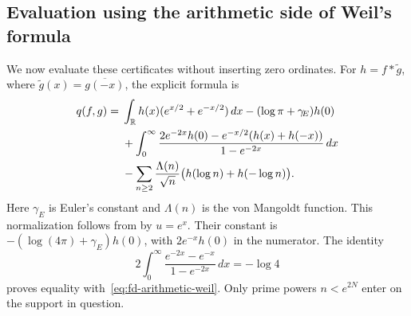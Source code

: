 \subsection{Evaluation using the arithmetic side of Weil's formula}

We now evaluate these certificates without inserting zero ordinates.
For \(h=f*\widetilde g\), where
\(\widetilde g(x)=\overline{g(-x)}\), the explicit formula is
\begin{align}
 q(f,g)
 ={}&\int_{\mathbb R}h(x)(e^{x/2}+e^{-x/2})\,dx
       -(\log\pi+\gamma_{\!E})h(0)\notag\\
 &+\int_0^\infty
   \frac{2e^{-2x}h(0)-e^{-x/2}(h(x)+h(-x))}
        {1-e^{-2x}}\,dx\notag\\
 &-\sum_{n\ge2}\frac{\Lambda(n)}{\sqrt n}
             \bigl(h(\log n)+h(-\log n)\bigr).
 \label{eq:fd-arithmetic-weil}
\end{align}
Here \(\gamma_{\!E}\) is Euler's constant and \(\Lambda(n)\)
is the von Mangoldt function. This normalization follows from
\cite[(3.2)--(3.7), pp.~5--6]{ccm2025} by \(u=e^x\).
Their constant is \(-(\log(4\pi)+\gamma_{\!E})h(0)\), with
\(2e^{-x}h(0)\) in the numerator. The identity
\[
 2\int_0^\infty\frac{e^{-2x}-e^{-x}}{1-e^{-2x}}\,dx=-\log4
\]
proves equality with~\eqref{eq:fd-arithmetic-weil}.
Only prime powers \(n<e^{2N}\) enter on the support in question.

